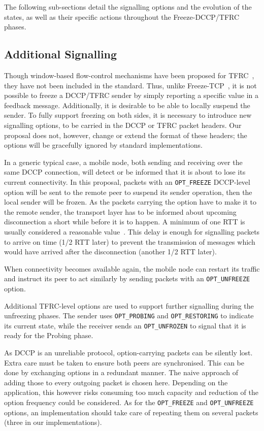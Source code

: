 \documentclass[twocolumn]{nictatechreport}
\begin{document}
The following sub-sections detail the signalling options and the evolution of the
states, as well as their specific actions throughout the Freeze-DCCP/TFRC phases.

\subsection{Additional Signalling}

Though window-based flow-control mechanisms have been proposed for
TFRC~\cite{2010lochin_chameleon}, they have not been included in the standard.
Thus, unlike Freeze-TCP~\cite{2000goff_freezetcp}, it is not possible to freeze
a DCCP/TFRC sender by simply reporting a specific value in a feedback message.
Additionally, it is desirable to be able to locally suspend the sender. To fully
support freezing on both sides, it is necessary to introduce new signalling
options, to be carried in the DCCP or TFRC packet headers. Our proposal does
not, however, change or extend the format of these headers; the options will be
gracefully ignored by standard implementations.

In a generic typical case, a mobile node, both sending and receiving over the
same DCCP connection, will detect or be informed that it is about to lose its
current connectivity. In this proposal, packets with an \verb#OPT_FREEZE#
DCCP-level option will be sent to the remote peer to suspend its sender
operation, then the local sender will be frozen. As the packets carrying the
option have to make it to the remote sender, the transport layer has to be
informed about upcoming disconnection a short while before it is to happen. A
minimum of one RTT is usually considered a reasonable
value~\cite{2000goff_freezetcp}. This delay is enough for signalling packets to
arrive on time (1/2 RTT later) to prevent the transmission of messages which
would have arrived after the disconnection (another 1/2 RTT later).

When connectivity becomes available again, the mobile node can restart its
traffic and instruct its peer to act similarly by sending packets with
an \verb#OPT_UNFREEZE# option.

Additional TFRC-level options are used to support further signalling during the
unfreezing phases. The sender uses \verb#OPT_PROBING# and \verb#OPT_RESTORING#
to indicate its current state, while the receiver sends an \verb#OPT_UNFROZEN#
to signal that it is ready for the Probing phase.

As DCCP is an unreliable protocol, option-carrying packets can be silently
lost. Extra care must be taken to ensure both peers are synchronised. This can
be done by exchanging options in a redundant manner. The naive approach of
adding those to every outgoing packet is chosen here. Depending on the
application, this however risks consuming too much capacity and reduction of the
option frequency could be considered. As for the \verb#OPT_FREEZE# and
\verb#OPT_UNFREEZE# options, an implementation should take care of repeating
them on several packets (three in our implementations).
\end{document}

